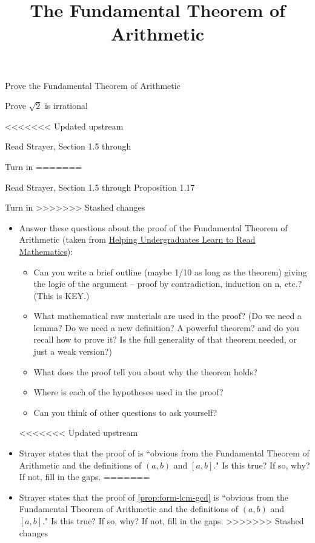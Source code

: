 \documentclass{ximera}
\title{The Fundamental Theorem of Arithmetic}
\begin{document}
\begin{abstract}
\end{abstract}
\maketitle


\begin{obj}
\item Prove the Fundamental Theorem of Arithmetic
\item  Prove $\sqrt{2}$ is irrational
\end{obj}

<<<<<<< Updated upstream
\begin{instructorNotes}
	\begin{pre}
		\item[Read] Strayer, Section 1.5 through 
		\item[Turn in] 
=======
\begin{pre}
	\item[Read] Strayer, Section 1.5 through Proposition 1.17
	\item[Turn in] 
>>>>>>> Stashed changes
		\begin{itemize}
		   \item Answer these questions about the proof of the Fundamental Theorem of Arithmetic (taken from \href{https://maa.org/node/121566}{Helping Undergraduates Learn to Read Mathematics}):
		   
		   \begin{itemize}
			   \item Can you write a brief outline (maybe 1/10 as long as the theorem) giving the logic of the argument -- proof by contradiction, induction on n, etc.? (This is KEY.)
			   \item What mathematical raw materials are used in the proof? (Do we need a lemma? Do we need a new definition? A powerful theorem? and do you recall how to prove it? Is the full generality of that theorem needed, or just a weak version?)
			   \item What does the proof tell you about why the theorem holds?
			   \item Where is each of the hypotheses used in the proof?
			   \item Can you think of other questions to ask yourself?
		   \end{itemize}
	   
<<<<<<< Updated upstream
	   \item Strayer states that the proof of  is ``obvious from the Fundamental Theorem of Arithmetic and the definitions of $(a,b)$ and $[a,b]$." Is this true? If so, why? If not, fill in the gaps.
=======
	\item Strayer states that the proof of \cref{prop:form-lcm-gcd} is ``obvious from the Fundamental Theorem of Arithmetic and the definitions of $(a,b)$ and $[a,b]$." Is this true? If so, why? If not, fill in the gaps.
>>>>>>> Stashed changes
		\end{itemize}
	   

\end{pre}
\end{pre}
\end{instructorNotes}
\end{document}
